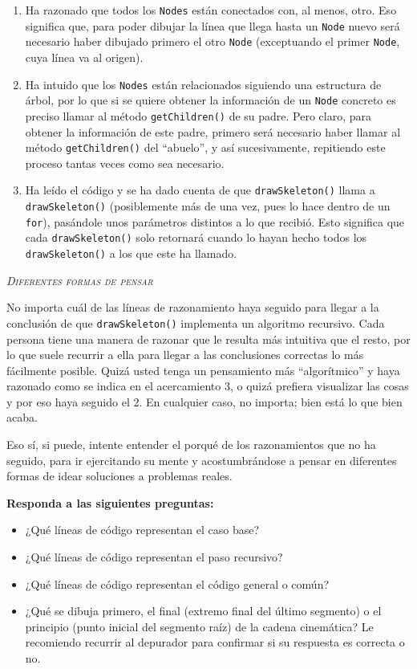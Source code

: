 \documentclass[10pt,a4paper,spanish]{article}
\newcommand{\sombreado}[2]{
  \begin{shaded}
    \begin{center} \emph{\textsc{#1}} \end{center}
    \noindent #2\\
  \end{shaded}
}
\newcommand{\code}[1]{\texttt{#1}}
\begin{document}
\begin{enumerate}
    \item Ha razonado que todos los \code{Nodes} están conectados con, al menos, otro. Eso significa que, para poder dibujar la línea que llega hasta un \code{Node} nuevo será necesario haber dibujado primero el otro \code{Node} (exceptuando el primer \code{Node}, cuya línea va al origen).
    \item Ha intuido que los \code{Nodes} están relacionados siguiendo una estructura de árbol, por lo que si se quiere obtener la información de un \code{Node} concreto es preciso llamar al método \code{getChildren()} de su padre. Pero claro, para obtener la información de este padre, primero será necesario haber llamar al método \code{getChildren()} del ``abuelo'', y así sucesivamente, repitiendo este proceso tantas veces como sea necesario.
    \item Ha leído el código y se ha dado cuenta de que \code{drawSkeleton()} llama a \code{drawSkeleton()} (posiblemente más de una vez, pues lo hace dentro de un \code{for}), pasándole unos parámetros distintos a lo que recibió. Esto significa que cada \code{drawSkeleton()} solo retornará cuando lo hayan hecho todos los \code{drawSkeleton()} a los que este ha llamado.
\end{enumerate}

\sombreado{Diferentes formas de pensar}{No importa cuál de las líneas de razonamiento haya seguido para llegar a la conclusión de que \code{drawSkeleton()} implementa un algoritmo recursivo. Cada persona tiene una manera de razonar que le resulta más intuitiva que el resto, por lo que suele recurrir a ella para llegar a las conclusiones correctas lo más fácilmente posible. Quizá usted tenga un pensamiento más ``algorítmico'' y haya razonado como se indica en el acercamiento 3, o quizá prefiera visualizar las cosas y por eso haya seguido el 2. En cualquier caso, no importa; bien está lo que bien acaba.

Eso sí, si puede, intente entender el porqué de los razonamientos que no ha seguido, para ir ejercitando su mente y acostumbrándose a pensar en diferentes formas de idear soluciones a problemas reales.}

\textbf{Responda a las siguientes preguntas:}

\begin{itemize}
    \item ¿Qué líneas de código representan el caso base?
    \item ¿Qué líneas de código representan el paso recursivo?
    \item ¿Qué líneas de código representan el código general o común?
    \item ¿Qué se dibuja primero, el final (extremo final del último segmento) o el principio (punto inicial del segmento raíz) de la cadena cinemática? Le recomiendo recurrir al depurador para confirmar si su respuesta es correcta o no.
\end{itemize}
\end{document}
